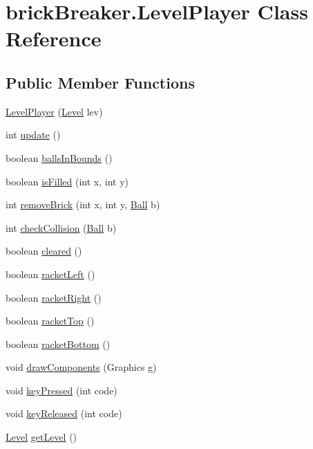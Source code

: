 \hypertarget{classbrick_breaker_1_1_level_player}{
\section{brickBreaker.LevelPlayer Class Reference}
\label{classbrick_breaker_1_1_level_player}
}
\subsection*{Public Member Functions}
\begin{DoxyCompactItemize}
\item 
\hyperlink{classbrick_breaker_1_1_level_player_a34f8b2db5684239038d4b5f33d7c93f6}{LevelPlayer} (\hyperlink{classbrick_breaker_1_1_level}{Level} lev)
\item 
int \hyperlink{classbrick_breaker_1_1_level_player_ad141c01fb30f6982c5b7932dd8ca901a}{update} ()
\item 
boolean \hyperlink{classbrick_breaker_1_1_level_player_aa5069116c7e903a1cf8d6663260905b2}{ballsInBounds} ()
\item 
boolean \hyperlink{classbrick_breaker_1_1_level_player_a298ae45b06799f0299d4b518075b9599}{isFilled} (int x, int y)
\item 
int \hyperlink{classbrick_breaker_1_1_level_player_a6aa16018bbba510ef65b6d43baaf8dc3}{removeBrick} (int x, int y, \hyperlink{classbrick_breaker_1_1_ball}{Ball} b)
\item 
int \hyperlink{classbrick_breaker_1_1_level_player_a0faa4b97a3ae3d8f473a5b70de9ab45b}{checkCollision} (\hyperlink{classbrick_breaker_1_1_ball}{Ball} b)
\item 
boolean \hyperlink{classbrick_breaker_1_1_level_player_a952e8b565a2c36ac471f7ab020972294}{cleared} ()
\item 
boolean \hyperlink{classbrick_breaker_1_1_level_player_ad4ab8305c27d7ee5a1c4a05488705a53}{racketLeft} ()
\item 
boolean \hyperlink{classbrick_breaker_1_1_level_player_a95c24168beb56156276b636954f210bc}{racketRight} ()
\item 
boolean \hyperlink{classbrick_breaker_1_1_level_player_ae31f4ca8b38e813587e795d681edfb0d}{racketTop} ()
\item 
boolean \hyperlink{classbrick_breaker_1_1_level_player_a6a7980415c6fed32a9f6c9271bae6220}{racketBottom} ()
\item 
void \hyperlink{classbrick_breaker_1_1_level_player_ae54384ce113e96099dd14d73acd7de5e}{drawComponents} (Graphics g)
\item 
void \hyperlink{classbrick_breaker_1_1_level_player_a1ebfab24bc0e7e7e6851f7856e486d8d}{keyPressed} (int code)
\item 
void \hyperlink{classbrick_breaker_1_1_level_player_a32dd9508bac5135b7f2706b807ada71e}{keyReleased} (int code)
\item 
\hyperlink{classbrick_breaker_1_1_level}{Level} \hyperlink{classbrick_breaker_1_1_level_player_a732aa75e9304df978a19452b95b6ee87}{getLevel} ()
\end{DoxyCompactItemize}
